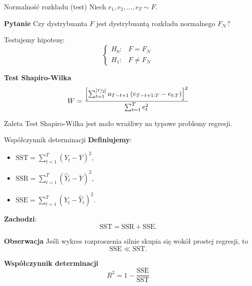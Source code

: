 \documentclass[a4paper, 11pt]{beamer}
\begin{document}
	\begin{frame}{Normalność rozkładu (test)}
		Niech $e_1, e_2, \ldots, e_T \sim F.$
		
		\begin{block}{\textbf{Pytanie}}
			Czy dystrybuanta $F$ jest dystrybuantą rozkładu normalnego $F_{\mathcal{N}}?$
		\end{block}

		Testujemy hipotezę: \[
			\begin{cases}
				H_{0}: & F = F_{\mathcal{N}}\\
				H_{1}: & F \neq F_{\mathcal{N}}
			\end{cases}
		\]
		
		\begin{block}{\textbf{Test Shapiro-Wilka}} \[
				W = \frac{
					\left[
						\sum_{t=1}^{\left[\nicefrac{T}{2}\right]}a_{T-t+1}\left(e_{T-t+1:T}-e_{t:T}\right)
					\right]^{2}
				}{
					\sum_{t=1}^{T} e_{t}^{2}
				}
			\]
		\end{block}
		
		\begin{alert}{Zaleta}
			Test Shapiro-Wilka jest mało wrażliwy na typowe problemy regresji.
		\end{alert}
		
	\end{frame}
	
	\begin{frame}{Współczynnik determinacji}
		\textbf{Definiujemy}:
		\begin{itemize}
			\item $\mbox{SST} = \sum_{t=1}^{T} \left(Y_t - \overline{Y}\right)^2,$
			\item $\mbox{SSR} = \sum_{t=1}^{T} \left(\hat{Y}_t - \overline{Y}\right)^2,$
			\item $\mbox{SSE} = \sum_{t=1}^{T} \left(Y_t - \hat{Y}_t\right)^2.$
		\end{itemize}
		\textbf{Zachodzi}: \[
			\mbox{SST} = \mbox{SSR} + \mbox{SSE}.
		\]
		\begin{alert}{\textbf{Obserwacja}}
			Jeśli wykres rozproszenia silnie skupia się wokół prostej regresji, to \[
				\mbox{SSE} \ll \mbox{SST}.
			\]
		\end{alert}
		\begin{block}{\textbf{Współczynnik determinacji}}
			\[
				R^2 = 1 - \frac{\mbox{SSE}}{\mbox{SST}}
			\]
		\end{block}
	\end{frame}
	
\end{document}
